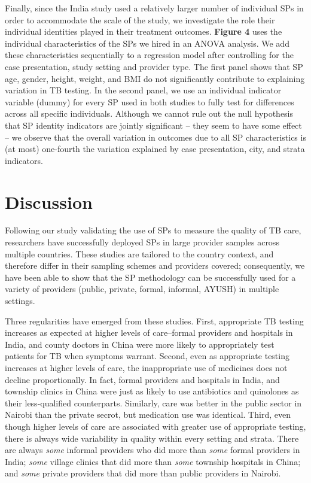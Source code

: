 \documentclass[fleqn,10pt]{wlscirep}
\begin{document}
Finally, since the India study used a relatively larger number of individual SPs in order to accommodate the scale of the study, we investigate the role their individual identities played in their treatment outcomes. \textbf{Figure 4} uses the individual characteristics of the SPs we hired in an ANOVA analysis. We add these characteristics sequentially to a regression model after controlling for the case presentation, study setting and provider type. The first panel shows that SP age, gender, height, weight, and BMI do not significantly contribute to explaining variation in TB testing. In the second panel, we use an individual indicator variable (dummy) for every SP used in both studies to fully test for differences across all specific individuals. Although we cannot rule out the null hypothesis that SP identity indicators are jointly significant -- they seem to have some effect -- we observe that the overall variation in outcomes due to all SP characteristics is (at most) one-fourth the variation explained by case presentation, city, and strata indicators.

\section*{Discussion}
Following our study validating the use of SPs to measure the quality of TB care, researchers have successfully deployed SPs in large provider samples across multiple countries. These studies are tailored to the country context, and therefore differ in their sampling schemes and providers covered; consequently, we have been able to show that the SP methodology can be successfully used for a variety of providers (public, private, formal, informal, AYUSH) in multiple settings.

Three regularities have emerged from these studies. First, appropriate TB testing increases as expected at higher levels of care--formal providers and hospitals in India, and county doctors in China were more likely to appropriately test patients for TB when symptoms warrant. Second, even as appropriate testing increases at higher levels of care, the inappropriate use of medicines does not decline proportionally. In fact, formal providers and hospitals in India, and township clinics in China were just as likely to use antibiotics and quinolones as their less-qualified counterparts. Similarly, care was better in the public sector in Nairobi than the private secrot, but medication use was identical. Third, even though higher levels of care are associated with greater use of appropriate testing, there is always wide variability in quality within every setting and strata. There are always \textit{some} informal providers who did more than \textit{some} formal providers in India; \textit{some} village clinics that did more than \textit{some} township hospitals in China; and \textit{some} private providers that did more than public providers in Nairobi.
\end{document}
